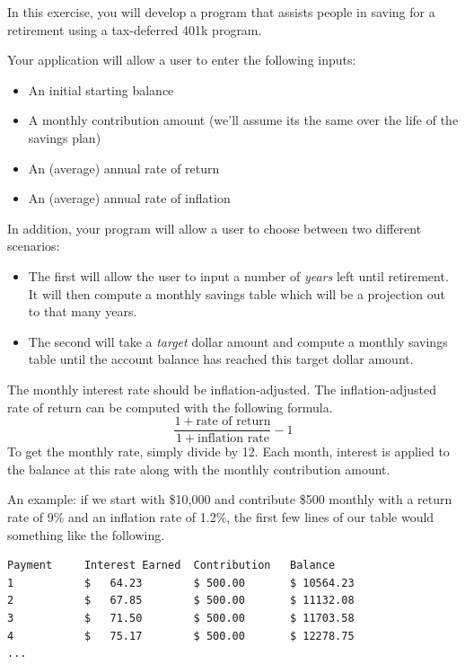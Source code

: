 \begin{exer}
In this exercise, you will develop a program that assists people in saving for a retirement
using a tax-deferred 401k program.  

Your application will allow a user to enter the following inputs:
\begin{itemize}
  \item An initial starting balance
  \item A monthly contribution amount (we'll assume its the same over the life of the savings plan)
  \item An (average) annual rate of return
  \item An (average) annual rate of inflation
\end{itemize}

In addition, your program will allow a user to choose between two different scenarios:
\begin{itemize}
  \item The first will allow the user to input a number of \emph{years} left until retirement.  
  	It will then compute a monthly savings table which will be a projection out to that many years.
  \item The second will take a \emph{target} dollar amount and compute a monthly savings
  	table until the account balance has reached this target dollar amount.
\end{itemize}

The monthly interest rate should be inflation-adjusted.  The inflation-adjusted 
rate of return can be computed with the following formula.
  $$\frac{1 + \textrm{rate of return}}{1+\textrm{inflation rate}} - 1$$
To get the monthly rate, simply divide by 12.  Each month, interest is applied to the balance at this 
rate along with the monthly contribution amount.

An example: if we start with \$10,000 and contribute \$500 monthly with a return rate of 9\% and
an inflation rate of 1.2\%, the first few lines of our table would something like the following.

\begin{verbatim}
Payment     Interest Earned  Contribution   Balance
1           $   64.23        $ 500.00       $ 10564.23
2           $   67.85        $ 500.00       $ 11132.08
3           $   71.50        $ 500.00       $ 11703.58
4           $   75.17        $ 500.00       $ 12278.75
...
\end{verbatim}

\end{exer}

